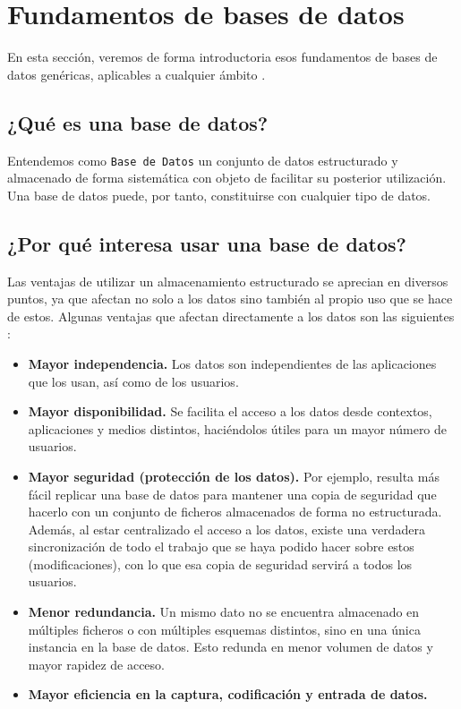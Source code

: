 \section{Fundamentos de bases de datos}

En esta sección, veremos de forma introductoria esos fundamentos de bases de datos genéricas, aplicables a cualquier ámbito \cite{ref2}.

\subsection*{¿Qué es una base de datos?}

Entendemos como \texttt{Base de Datos} un conjunto de datos estructurado y almacenado de forma sistemática con objeto de facilitar su posterior utilización. Una base de datos puede, por tanto, constituirse con cualquier tipo de datos.

\subsection*{¿Por qué interesa usar una base de datos?}

Las ventajas de utilizar un almacenamiento estructurado se aprecian en diversos puntos, ya que afectan no solo a los datos sino también al propio uso que se hace de estos. Algunas ventajas que afectan directamente a los datos son las siguientes \cite{ref3}:

\begin{itemize}
   \item \textbf{Mayor independencia.} Los datos son independientes de las aplicaciones que los usan, así como de los usuarios.
   
    \item \textbf{Mayor disponibilidad.} Se facilita el acceso a los datos desde contextos, aplicaciones y medios distintos, haciéndolos útiles para un mayor número de usuarios.
    
    \item \textbf{Mayor seguridad (protección de los datos).} Por ejemplo, resulta más fácil replicar una base de datos para mantener una copia de seguridad que hacerlo con un conjunto de ficheros almacenados de forma no estructurada. Además, al estar centralizado el acceso a los datos, existe una verdadera sincronización de todo el trabajo que se haya podido hacer sobre estos (modificaciones), con lo que esa copia de seguridad servirá a todos los usuarios.
    
    \item \textbf{Menor redundancia.} Un mismo dato no se encuentra almacenado en múltiples ficheros o con múltiples esquemas distintos, sino en una única instancia en la base de datos. Esto redunda en menor volumen de datos y mayor rapidez de acceso.
    
    \item \textbf{Mayor eficiencia en la captura, codificación y entrada de datos.} 
\end{itemize}

